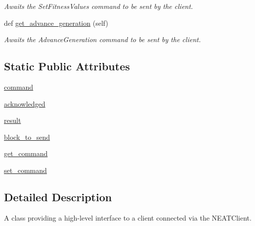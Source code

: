 \begin{DoxyCompactItemize}
\begin{DoxyCompactList}\small\item\em Awaits the Set\+Fitness\+Values command to be sent by the client. \end{DoxyCompactList}\item 
def \hyperlink{classNEAT__PyGenetics_1_1NEAT_1_1Networking_1_1Server_1_1SimulationConnector_1_1SimulationConnector_a5a07ea6d6971102b7dbe65e8fbaeb2c6}{get\+\_\+advance\+\_\+generation} (self)
\begin{DoxyCompactList}\small\item\em Awaits the Advance\+Generation command to be sent by the client. \end{DoxyCompactList}\end{DoxyCompactItemize}
\subsection*{Static Public Attributes}
\begin{DoxyCompactItemize}
\item 
\hyperlink{classNEAT__PyGenetics_1_1NEAT_1_1Networking_1_1Server_1_1SimulationConnector_1_1SimulationConnector_a2ee895f0adc1c5612da513e76337a2a1}{command}
\item 
\hyperlink{classNEAT__PyGenetics_1_1NEAT_1_1Networking_1_1Server_1_1SimulationConnector_1_1SimulationConnector_a382935d414f40fe1f061eb2599aaee45}{acknowledged}
\item 
\hyperlink{classNEAT__PyGenetics_1_1NEAT_1_1Networking_1_1Server_1_1SimulationConnector_1_1SimulationConnector_a192917886950be80d6b617d89741272e}{result}
\item 
\hyperlink{classNEAT__PyGenetics_1_1NEAT_1_1Networking_1_1Server_1_1SimulationConnector_1_1SimulationConnector_acf2ca405ae294326df8c2ef7b32d7024}{block\+\_\+to\+\_\+send}
\item 
\hyperlink{classNEAT__PyGenetics_1_1NEAT_1_1Networking_1_1Server_1_1SimulationConnector_1_1SimulationConnector_a09ae391da51cbab362309cde45eee5a4}{get\+\_\+command}
\item 
\hyperlink{classNEAT__PyGenetics_1_1NEAT_1_1Networking_1_1Server_1_1SimulationConnector_1_1SimulationConnector_ae984255e91818c23a045b807d373bf1b}{set\+\_\+command}
\end{DoxyCompactItemize}


\subsection{Detailed Description}
A class providing a high-\/level interface to a client connected via the N\+E\+A\+T\+Client. 

